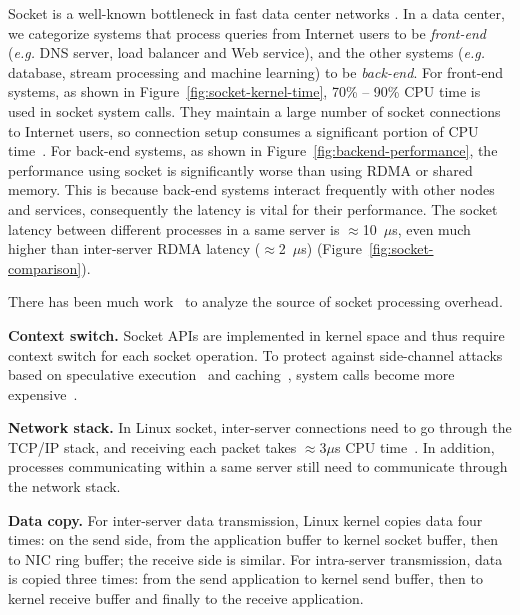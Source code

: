 Socket is a well-known bottleneck in fast data center networks . In a data center, we categorize systems that process queries from Internet users to be \textit{front-end} (\textit{e.g.} DNS server, load balancer and Web service), and the other systems (\textit{e.g.} database, stream processing and machine learning) to be \textit{back-end}.
For front-end systems, as shown in Figure~\ref{fig:socket-kernel-time}, 70\% -- 90\% CPU time is used in socket system calls. They maintain a large number of socket connections to Internet users, so connection setup consumes a significant portion of CPU time~\cite{lin2016scalable}.
For back-end systems, as shown in Figure~\ref{fig:backend-performance}, the performance using socket is significantly worse than using RDMA or shared memory. This is because back-end systems interact frequently with other nodes and services, consequently the latency is vital for their performance. The socket latency between different processes in a same server is $\approx$10~$\mu$s, even much higher than inter-server RDMA latency ($\approx$2~$\mu$s) (Figure~\ref{fig:socket-comparison}).


There has been much work~\cite{peter2016arrakis,lin2016scalable} to analyze the source of socket processing overhead.

\textbf{Context switch.}
Socket APIs are implemented in kernel space and thus require context switch for each socket operation. To protect against side-channel attacks based on speculative execution~\cite{Kocher2018spectre} and caching~\cite{Lipp2018meltdown}, system calls become more expensive~\cite{kpti}.

\textbf{Network stack.}
In Linux socket, inter-server connections need to go through the TCP/IP stack, and receiving each packet takes $\approx$3$\mu$s CPU time~\cite{peter2016arrakis}. In addition, processes communicating within a same server still need to communicate through the network stack.

\textbf{Data copy.}
For inter-server data transmission, Linux kernel copies data four times: on the send side, from the application buffer to kernel socket buffer, then to NIC ring buffer; the receive side is similar.
For intra-server transmission, data is copied three times: from the send application to kernel send buffer, then to kernel receive buffer and finally to the receive application.

